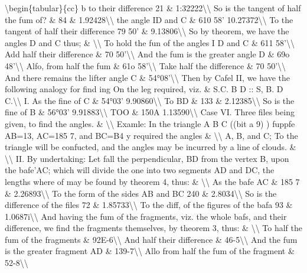 \documentclass{article}
\begin{document}
\textbackslash{}begin\{tabular\}\{cc\}
b to their difference 21 \& 1:32222\textbackslash{}\textbackslash{}
So is the tangent of half the fum of? \& 84 \& 1.92428\textbackslash{}\textbackslash{}
the angle ID and C \& 610 58' 10.27372\textbackslash{}\textbackslash{}
To the tangent of half their difference 79 50' \& 9.13806\textbackslash{}\textbackslash{}
So by theorem, we have the angles D and C thus; \& \textbackslash{}\textbackslash{}
To hold the fun of the angles I D and C \& 611 58'\textbackslash{}\textbackslash{}
Add half their difference \& 70 50'\textbackslash{}\textbackslash{}
And the fum is the greater angle D \& 69o 48'\textbackslash{}\textbackslash{}
Alfo, from half the fum \& 61o 58'\textbackslash{}\textbackslash{}
Take half the difference \& 70 50'\textbackslash{}\textbackslash{}
And there remains the lifter angle C \& 54°08'\textbackslash{}\textbackslash{}
Then by Cafel II, we have the following analogy for find ing On the leg required, viz. \& S.C. B D :: S, B. D C.\textbackslash{}\textbackslash{}
I. As the fine of C \& 54°03' 9.90860\textbackslash{}\textbackslash{}
To BD \& 133 \& 2.12385\textbackslash{}\textbackslash{}
So is the fine of B \& 56°03' 9.91883\textbackslash{}\textbackslash{}
TOO \& 150A 1.13590\textbackslash{}\textbackslash{}
Case VI. Three files being given, to find the angles. \& \textbackslash{}\textbackslash{}
Examle: In the triangle A B C ((bit a 9) ) fuppfe AB=13, AC=185 7, and BC=B4 y required the angles \& \textbackslash{}\textbackslash{}
A, B, and C; To the triangle will be confucted, and the angles may be incurred by a line of clouds. \& \textbackslash{}\textbackslash{}
II. By undertaking: Let fall the perpendicular, BD from the vertex B, upon the bafe’AC; which will divide the one into two segments AD and DC, the lengths where of may be found by theorem 4, thus: \& \textbackslash{}\textbackslash{}
As the bafe AC \& 185 7 \& 2.26893\textbackslash{}\textbackslash{}
To the form of the sides AB and BC 240 \& 2.8034\textbackslash{}\textbackslash{}
So is the difference of the files 72 \& 1.85733\textbackslash{}\textbackslash{}
To the diff, of the figures of the bafa 93 \& 1.0687i\textbackslash{}\textbackslash{}
And having the fum of the fragments, viz. the whole bafs, and their difference, we find the fragments themselves, by theorem 3, thus: \& \textbackslash{}\textbackslash{}
To half the fum of the fragments \& 92E-6\textbackslash{}\textbackslash{}
And half their difference \& 46-5\textbackslash{}\textbackslash{}
And the fum is the greater fragment AD \& 139-7\textbackslash{}\textbackslash{}
Allo from half the fum of the fragment \& 52-8\textbackslash{}\textbackslash{}
\end{document}

